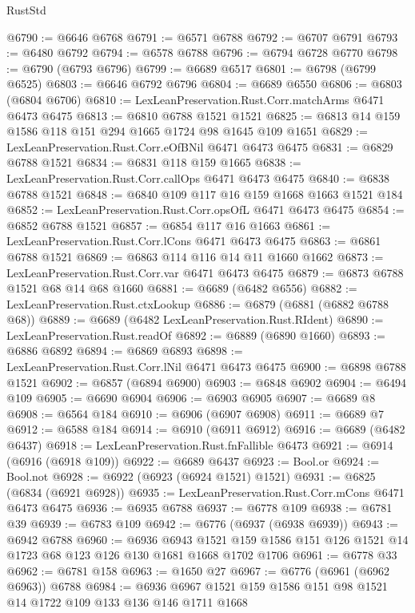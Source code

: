 \begin{lexlean}{RustStd}
\begin{coremodule}
@6790 := @6646 @6768
@6791 := @6571 @6788
@6792 := @6707 @6791
@6793 := @6480 @6792
@6794 := @6578 @6788
@6796 := @6794 @6728 @6770
@6798 := @6790 (@6793 @6796)
@6799 := @6689 @6517
@6801 := @6798 (@6799 @6525)
@6803 := @6646 @6792 @6796
@6804 := @6689 @6550
@6806 := @6803 (@6804 @6706)
@6810 := LexLeanPreservation.Rust.Corr.matchArms @6471 @6473 @6475
@6813 := @6810 @6788 @1521 @1521
@6825 := @6813 @14 @159 @1586 @118 @151 @294 @1665 @1724 @98 @1645 @109 @1651
@6829 := LexLeanPreservation.Rust.Corr.eOfBNil @6471 @6473 @6475
@6831 := @6829 @6788 @1521
@6834 := @6831 @118 @159 @1665
@6838 := LexLeanPreservation.Rust.Corr.callOps @6471 @6473 @6475
@6840 := @6838 @6788 @1521
@6848 := @6840 @109 @117 @16 @159 @1668 @1663 @1521 @184
@6852 := LexLeanPreservation.Rust.Corr.opsOfL @6471 @6473 @6475
@6854 := @6852 @6788 @1521
@6857 := @6854 @117 @16 @1663
@6861 := LexLeanPreservation.Rust.Corr.lCons @6471 @6473 @6475
@6863 := @6861 @6788 @1521
@6869 := @6863 @114 @116 @14 @11 @1660 @1662
@6873 := LexLeanPreservation.Rust.Corr.var @6471 @6473 @6475
@6879 := @6873 @6788 @1521 @68 @14 @68 @1660
@6881 := @6689 (@6482 @6556)
@6882 := LexLeanPreservation.Rust.ctxLookup
@6886 := @6879 (@6881 (@6882 @6788 @68))
@6889 := @6689 (@6482 LexLeanPreservation.Rust.RIdent)
@6890 := LexLeanPreservation.Rust.readOf
@6892 := @6889 (@6890 @1660)
@6893 := @6886 @6892
@6894 := @6869 @6893
@6898 := LexLeanPreservation.Rust.Corr.lNil @6471 @6473 @6475
@6900 := @6898 @6788 @1521
@6902 := @6857 (@6894 @6900)
@6903 := @6848 @6902
@6904 := @6494 @109
@6905 := @6690 @6904
@6906 := @6903 @6905
@6907 := @6689 @8
@6908 := @6564 @184
@6910 := @6906 (@6907 @6908)
@6911 := @6689 @7
@6912 := @6588 @184
@6914 := @6910 (@6911 @6912)
@6916 := @6689 (@6482 @6437)
@6918 := LexLeanPreservation.Rust.fnFallible @6473
@6921 := @6914 (@6916 (@6918 @109))
@6922 := @6689 @6437
@6923 := Bool.or
@6924 := Bool.not
@6928 := @6922 (@6923 (@6924 @1521) @1521)
@6931 := @6825 (@6834 (@6921 @6928))
@6935 := LexLeanPreservation.Rust.Corr.mCons @6471 @6473 @6475
@6936 := @6935 @6788
@6937 := @6778 @109
@6938 := @6781 @39
@6939 := @6783 @109
@6942 := @6776 (@6937 (@6938 @6939))
@6943 := @6942 @6788
@6960 := @6936
    @6943
    @1521
    @159
    @1586
    @151
    @126
    @1521
    @14
    @1723
    @68
    @123
    @126
    @130
    @1681
    @1668
    @1702
    @1706
@6961 := @6778 @33
@6962 := @6781 @158
@6963 := @1650 @27
@6967 := @6776 (@6961 (@6962 @6963)) @6788
@6984 := @6936
    @6967
    @1521
    @159
    @1586
    @151
    @98
    @1521
    @14
    @1722
    @109
    @133
    @136
    @146
    @1711
    @1668

\end{coremodule}
\end{lexlean}
